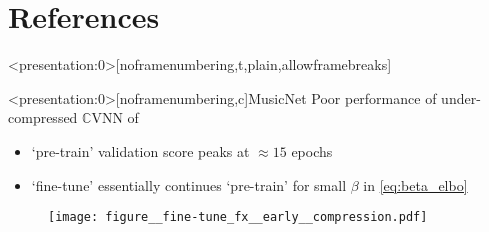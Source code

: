 \documentclass{beamer}
\newcommand{\cplx}{\mathbb{C}}
\begin{document}



\section{References} %
\label{sec:references}

\begin{frame}<presentation:0>[noframenumbering,t,plain,allowframebreaks]{\insertsection}
  \tiny
  
  
\end{frame}


\appendix
\begin{frame}<presentation:0>[noframenumbering,c]{MusicNet}{\insertsection}
  Poor performance of under-compressed $\cplx$VNN of \citet{trabelsi_deep_2018}
  \begin{itemize}
    \item `pre-train' validation score peaks at $\approx 15$ epochs
    \item `fine-tune' essentially continues `pre-train' for small $\beta$ in \eqref{eq:beta_elbo}
  \end{itemize}

  \begin{figure}[t]
    \centering
    \texttt{[image: figure\_\_fine-tune\_fx\_\_early\_\_compression.pdf]}
  \end{figure}
\end{frame}
\end{document}
